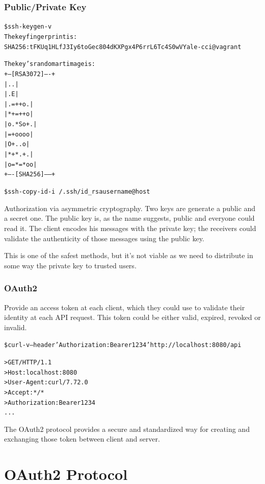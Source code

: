 \documentclass{style}
\begin{document}
\subsubsection{Public/Private Key}
\begin{alltt}
    \$ ssh-keygen -v
    The key fingerprint is:
    SHA256:tFKUq1HLfJ3Iy6toGec804dKXPgx4P6rrL6Tc4S0wVY ale-cci@vagrant

    The key's randomart image is:
    +---[RSA 3072]----+
    |        ..       |
    |       .E        |
    |     . =++ o .   |
    |      *+=++ o    |
    |     o.*So+.     |
    |      =+oooo     |
    |       O+..o     |
    |      *+*.+ .    |
    |     o=*=*oo     |
    +----[SHA256]-----+


    \$ ssh-copy-id -i ~/.ssh/id_rsa username@host
\end{alltt}
Authorization via asymmetric cryptography. Two keys are generate a public and a secret one.
The public key is, as the name suggests, public and everyone could read it.
The client encodes his messages with the private key; the receivers could validate the authenticity of those messages using the public key.

This is one of the safest methods, but it's not viable as we need to distribute in some way the private key to
trusted users.

\subsubsection{OAuth2}
Provide an access token at each client, which they could use to validate their
identity at each API request.  This token could be either valid, expired,
revoked or invalid.

\begin{alltt}
    \$ curl -v --header 'Authorization: Bearer 1234' http://localhost:8080/api

    > GET / HTTP/1.1
    > Host: localhost:8080
    > User-Agent: curl/7.72.0
    > Accept: */*
    > Authorization: Bearer 1234
    ...
\end{alltt}

The OAuth2 protocol provides a secure and standardized way for creating and exchanging those token between client and server.


\section{OAuth2 Protocol}
\end{document}
